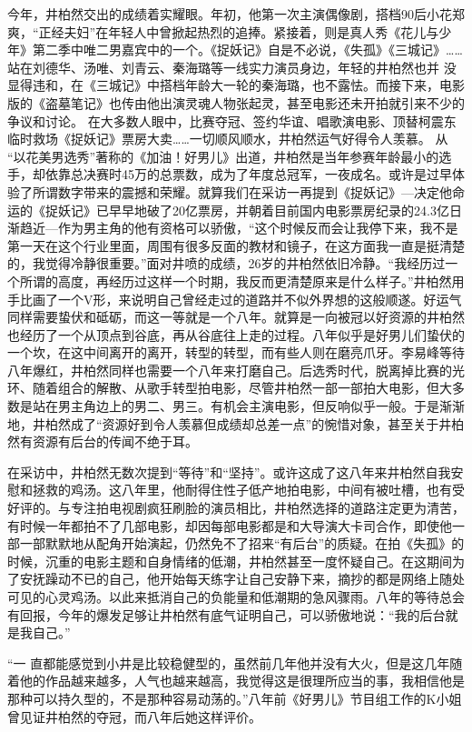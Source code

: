 \documentclass[12pt]{ctexart}
\begin{document}
今年，井柏然交出的成绩着实耀眼。年初，他第一次主演偶像剧，搭档90后小花郑爽，“正经夫妇”在年轻人中曾掀起热烈的追捧。紧接着，则是真人秀《花儿与少 年》第二季中唯二男嘉宾中的一个。《捉妖记》自是不必说，《失孤》《三城记》……站在刘德华、汤唯、刘青云、秦海璐等一线实力演员身边，年轻的井柏然也并 没显得违和，在《三城记》中搭档年龄大一轮的秦海璐，也不露怯。而接下来，电影版的《盗墓笔记》也传由他出演灵魂人物张起灵，甚至电影还未开拍就引来不少的争议和讨论。
在大多数人眼中，比赛夺冠、签约华谊、唱歌演电影、顶替柯震东临时救场《捉妖记》票房大卖……一切顺风顺水，井柏然运气好得令人羡慕。
从 “以花美男选秀”著称的《加油！好男儿》出道，井柏然是当年参赛年龄最小的选手，却依靠总决赛时45万的总票数，成为了年度总冠军，一夜成名。或许是过早体验了所谓数字带来的震撼和荣耀。就算我们在采访一再提到《捉妖记》—决定他命运的《捉妖记》已早早地破了20亿票房，并朝着目前国内电影票房纪录的24.3亿日渐趋近—作为男主角的他有资格可以骄傲，“这个时候反而会让我停下来，我不是第一天在这个行业里面，周围有很多反面的教材和镜子，在这方面我一直是挺清楚的，我觉得冷静很重要。”面对井喷的成绩，26岁的井柏然依旧冷静。“我经历过一个所谓的高度，再经历过这样一个时期，我反而更清楚原来是什么样子。”井柏然用手比画了一个V形，来说明自己曾经走过的道路并不似外界想的这般顺遂。好运气同样需要蛰伏和砥砺，而这一等就是一个八年。就算是一向被冠以好资源的井柏然也经历了一个从顶点到谷底，再从谷底往上走的过程。八年似乎是好男儿们蛰伏的一个坎，在这中间离开的离开，转型的转型，而有些人则在磨亮爪牙。李易峰等待八年爆红，井柏然同样也需要一个八年来打磨自己。后选秀时代，脱离掉比赛的光环、随着组合的解散、从歌手转型拍电影，尽管井柏然一部一部拍大电影，但大多数是站在男主角边上的男二、男三。有机会主演电影，但反响似乎一般。于是渐渐地，井柏然成了“资源好到令人羡慕但成绩却总差一点”的惋惜对象，甚至关于井柏然有资源有后台的传闻不绝于耳。

在采访中，井柏然无数次提到“等待”和“坚持”。或许这成了这八年来井柏然自我安慰和拯救的鸡汤。这八年里，他耐得住性子低产地拍电影，中间有被吐槽，也有受好评的。与专注拍电视剧疯狂刷脸的演员相比，井柏然选择的道路注定更为清苦，有时候一年都拍不了几部电影，却因每部电影都是和大导演大卡司合作，即使他一部一部默默地从配角开始演起，仍然免不了招来“有后台”的质疑。在拍《失孤》的时候，沉重的电影主题和自身情绪的低潮，井柏然甚至一度怀疑自己。在这期间为了安抚躁动不已的自己，他开始每天练字让自己安静下来，摘抄的都是网络上随处可见的心灵鸡汤。以此来抵消自己的负能量和低潮期的急风骤雨。八年的等待总会有回报，今年的爆发足够让井柏然有底气证明自己，可以骄傲地说：“我的后台就是我自己。”

“一 直都能感觉到小井是比较稳健型的，虽然前几年他并没有大火，但是这几年随着他的作品越来越多，人气也越来越高，我觉得这是很理所应当的事，我相信他是那种可以持久型的，不是那种容易动荡的。”八年前《好男儿》节目组工作的K小姐曾见证井柏然的夺冠，而八年后她这样评价。
\end{document}
